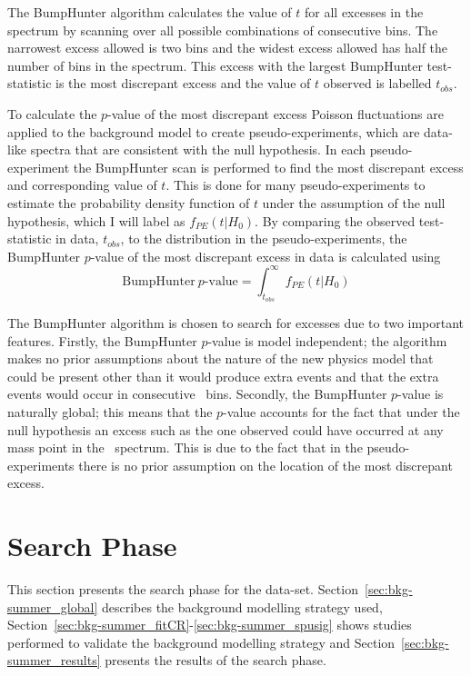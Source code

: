 The BumpHunter algorithm calculates the value of $t$ for all excesses in the~\mjj{} spectrum
by scanning over all possible combinations of consecutive bins.
The narrowest excess allowed is two bins and the widest excess allowed has half the number of bins in the spectrum.
This excess with the largest BumpHunter test-statistic is the most discrepant excess and the value of $t$ observed is labelled $t_{obs}$.

To calculate the \mbox{$p$-value} of the most discrepant excess
Poisson fluctuations are applied to the background model to create pseudo-experiments,
which are data-like spectra that are consistent with the null hypothesis.
In each pseudo-experiment the BumpHunter scan is performed to find the most discrepant excess and corresponding value of $t$.
This is done for many pseudo-experiments to estimate the probability density function of $t$ under the assumption of the null hypothesis,
which I will label as $f_{PE}(t| H_0)$.
By comparing the observed test-statistic in data, $t_{obs}$,
to the distribution in the pseudo-experiments,
the BumpHunter \mbox{$p$-value} of the most discrepant excess in data is calculated using
\begin{equation}
  \text{BumpHunter}~p\text{-value} = \int_{t_{obs}}^\infty f_{PE}(t | H_0)
\end{equation}

The BumpHunter algorithm is chosen to search for excesses due to two important features.
Firstly, the BumpHunter \mbox{$p$-value} is model independent;
the algorithm makes no prior assumptions about the nature of the new physics model that could be present
other than it would produce extra events and that the extra events would occur in consecutive~\mjj{} bins.
Secondly, the BumpHunter \mbox{$p$-value} is naturally global;
this means that the \mbox{$p$-value} accounts for the fact that under the null hypothesis an excess such as the one observed could have occurred at any mass point in the~\mjj{} spectrum.
This is due to the fact that in the pseudo-experiments there is no prior assumption on the location of the most discrepant excess.

\section{\summer{} Search Phase}
\label{sec:bkg-summer}

This section presents the search phase for the \summer{} data-set.
Section~\ref{sec:bkg-summer_global} describes the background modelling strategy used,
Section~\ref{sec:bkg-summer_fitCR}-\ref{sec:bkg-summer_spusig}
shows studies performed to validate the background modelling strategy
and Section~\ref{sec:bkg-summer_results} presents the results of the search phase.

